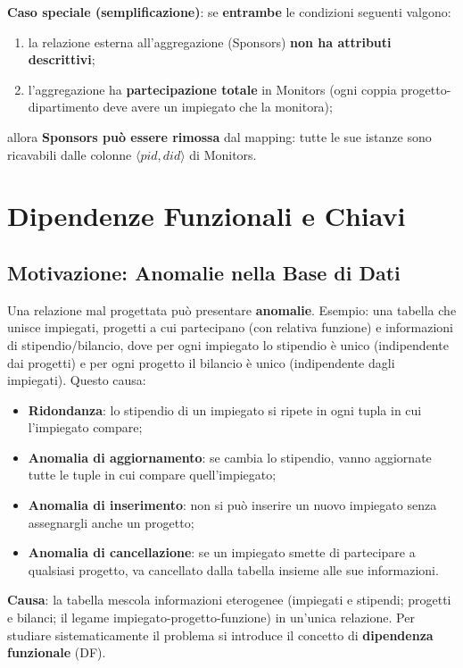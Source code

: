 \documentclass[12pt, a4paper]{article}
\begin{document}
\textbf{Caso speciale (semplificazione)}: se \textbf{entrambe} le condizioni seguenti valgono:
\begin{enumerate}
    \item la relazione esterna all'aggregazione (Sponsors) \textbf{non ha attributi descrittivi};
    \item l'aggregazione ha \textbf{partecipazione totale} in Monitors (ogni coppia progetto-dipartimento deve avere un impiegato che la monitora);
\end{enumerate}
allora \textbf{Sponsors può essere rimossa} dal mapping: tutte le sue istanze sono ricavabili dalle colonne $\langle pid, did\rangle$ di Monitors.


\section{Dipendenze Funzionali e Chiavi}

\subsection{Motivazione: Anomalie nella Base di Dati}

Una relazione mal progettata può presentare \textbf{anomalie}. Esempio: una tabella che unisce impiegati, progetti a cui partecipano (con relativa funzione) e informazioni di stipendio/bilancio, dove per ogni impiegato lo stipendio è unico (indipendente dai progetti) e per ogni progetto il bilancio è unico (indipendente dagli impiegati). Questo causa:
\begin{itemize}
    \item \textbf{Ridondanza}: lo stipendio di un impiegato si ripete in ogni tupla in cui l'impiegato compare;
    \item \textbf{Anomalia di aggiornamento}: se cambia lo stipendio, vanno aggiornate tutte le tuple in cui compare quell'impiegato;
    \item \textbf{Anomalia di inserimento}: non si può inserire un nuovo impiegato senza assegnargli anche un progetto;
    \item \textbf{Anomalia di cancellazione}: se un impiegato smette di partecipare a qualsiasi progetto, va cancellato dalla tabella insieme alle sue informazioni.
\end{itemize}
\textbf{Causa}: la tabella mescola informazioni eterogenee (impiegati e stipendi; progetti e bilanci; il legame impiegato-progetto-funzione) in un'unica relazione. Per studiare sistematicamente il problema si introduce il concetto di \textcolor{tocsec}{\textbf{dipendenza funzionale}} (DF).
\end{document}
